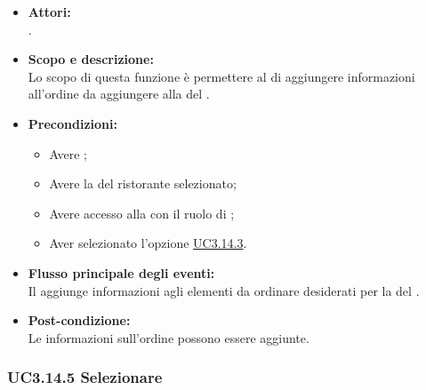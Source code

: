 \begin{itemize}
	\item \textbf{Attori:}
	\\.
	\item \textbf{Scopo e descrizione:} 
	\\Lo scopo di questa funzione è permettere al  di aggiungere informazioni all'ordine da aggiungere alla  del .
	\item \textbf{Precondizioni:}
	\begin{itemize}
		\item Avere ;
		\item Avere la  del ristorante selezionato;
		\item Avere accesso alla  con il ruolo di ;
		\item Aver selezionato l'opzione  \hyperref[UC3.14.3]{UC3.14.3}.
	\end{itemize}
	\item \textbf{Flusso principale degli eventi:}
	\\Il {} aggiunge informazioni agli elementi da ordinare desiderati per la  del .
	\item \textbf{Post-condizione:}
	\\Le informazioni sull'ordine possono essere aggiunte.
\end{itemize}

\subsubsection{UC3.14.5 Selezionare } \label{UC3.14.5}

